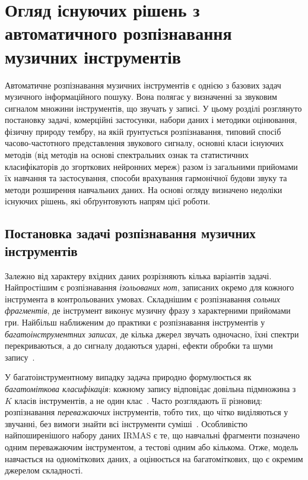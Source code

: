 
\chapter{Огляд існуючих рішень з автоматичного розпізнавання музичних інструментів}
\label{chap:review}

Автоматичне розпізнавання музичних інструментів є однією з базових задач
музичного інформаційного пошуку. Вона полягає у визначенні за звуковим
сигналом множини інструментів, що звучать у записі. У цьому розділі
розглянуто постановку задачі, комерційні застосунки, набори даних і
методики оцінювання, фізичну природу тембру, на якій ґрунтується
розпізнавання, типовий спосіб часово-частотного представлення звукового
сигналу, основні класи існуючих методів (від методів на основі спектральних
ознак та статистичних класифікаторів до згорткових нейронних мереж) разом
із загальними прийомами їх навчання та застосування, способи врахування
гармонічної будови звуку та методи розширення навчальних даних. На основі огляду визначено
недоліки існуючих рішень, які обґрунтовують напрям цієї роботи.

\section{Постановка задачі розпізнавання музичних інструментів}
\label{sec:task}

Залежно від характеру вхідних даних розрізняють кілька варіантів задачі.
Найпростішим є розпізнавання \textit{ізольованих нот}, записаних окремо для
кожного інструмента в контрольованих умовах. Складнішим є розпізнавання
\textit{сольних фрагментів}, де інструмент виконує музичну фразу з
характерними прийомами гри. Найбільш наближеним до практики є
розпізнавання інструментів у \textit{багатоінструментних записах}, де
кілька джерел звучать одночасно, їхні спектри перекриваються, а до сигналу
додаються ударні, ефекти обробки та шуми запису~\cite{essid2006,fuhrmann2012}.

У багатоінструментному випадку задача природно формулюється як
\textit{багатоміткова класифікація}: кожному запису відповідає довільна
підмножина з $K$ класів інструментів, а не один клас~\cite{tsoumakas2007}.
Часто розглядають її різновид: розпізнавання \textit{переважаючих}
інструментів, тобто тих, що чітко виділяються у звучанні, без вимоги
знайти всі інструменти суміші~\cite{irmas2012}. Особливістю найпоширенішого
набору даних IRMAS є те, що навчальні фрагменти позначено одним
переважаючим інструментом, а тестові одним або кількома. Отже, модель
навчається на одноміткових даних, а оцінюється на багатоміткових, що є
окремим джерелом складності.

